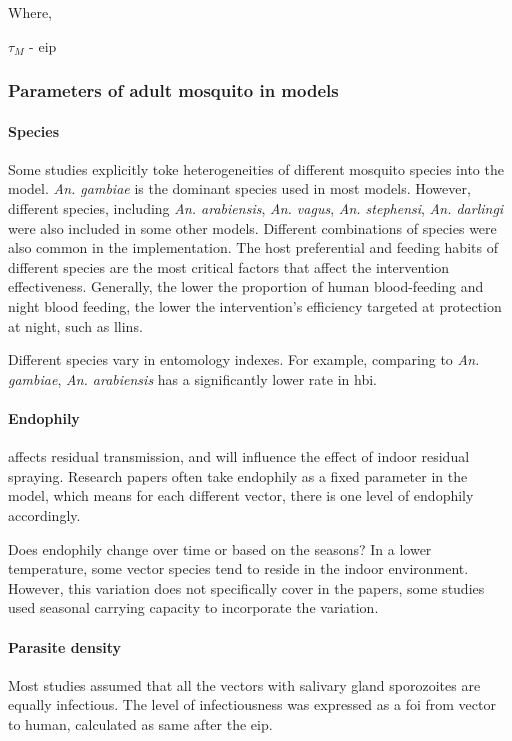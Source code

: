 \documentclass[a4paper, 12pt, twoside]{article}
\begin{document}
Where,
\begin{centering}
  $\tau_M$ - \gls{eip} \\
\end{centering}

\subsubsection{Parameters of adult mosquito in models}
\paragraph{Species}%
\label{par:species}
Some studies explicitly toke heterogeneities of different mosquito species into the model.
\textit{An. gambiae} is the dominant species used in most models.
However, different species, including \textit{An. arabiensis}, \textit{An. vagus}, \textit{An. stephensi}, \textit{An. darlingi} were also included in some other models.
Different combinations of species were also common in the implementation.
The host preferential and feeding habits of different species are the most critical factors that affect the intervention effectiveness.
Generally, the lower the proportion of human blood-feeding and night blood feeding, the lower the intervention's efficiency targeted at protection at night, such as \gls{llins}.

Different species vary in entomology indexes.
For example, comparing to \textit{An. gambiae}, \textit{An. arabiensis} has a significantly lower rate in \gls{hbi}.

\paragraph{Endophily}%
\label{par:endophily}
affects residual transmission, and will influence the effect of indoor residual spraying.
Research papers often take endophily as a fixed parameter in the model, which means for each different vector, there is one level of endophily accordingly.

Does endophily change over time or based on the seasons?
In a lower temperature,  some vector species tend to reside in the indoor environment.
However, this variation does not specifically cover in the papers, some studies used seasonal carrying capacity to incorporate the variation.

\paragraph{Parasite density}%
\label{par:parasite_density}
Most studies assumed that all the vectors with salivary gland sporozoites are equally infectious.
The level of infectiousness was expressed as a \gls{foi} from vector to human, calculated as same after the \gls{eip}.
\end{document}
